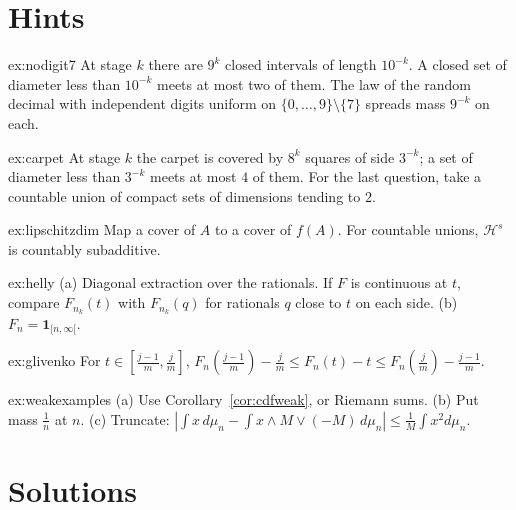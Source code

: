 \section{Hints}

\begin{hint}{ex:nodigit7}
At stage $k$ there are $9^k$ closed intervals of length $10^{-k}$. A closed set of diameter less than $10^{-k}$ meets at most two of them. The law of the random decimal with independent digits uniform on
$\{0,\ldots,9\}\setminus\{7\}$ spreads mass $9^{-k}$ on each.
\end{hint}
\begin{hint}{ex:carpet}
At stage $k$ the carpet is covered by $8^k$ squares of side $3^{-k}$; a set of diameter less than $3^{-k}$ meets at most $4$ of them. For the last question, take a countable union of compact sets of dimensions
tending to $2$.
\end{hint}
\begin{hint}{ex:lipschitzdim}
Map a cover of $A$ to a cover of $f(A)$. For countable unions, $\mathcal H^s$ is countably subadditive.
\end{hint}
\begin{hint}{ex:helly}
(a) Diagonal extraction over the rationals. If $F$ is continuous at $t$, compare $F_{n_k}(t)$ with $F_{n_k}(q)$ for rationals $q$ close to $t$ on each side. (b) $F_n=\mathbf 1_{[n,\infty[}$.
\end{hint}
\begin{hint}{ex:glivenko}
For $t\in[\frac{j-1}m,\frac jm]$, $F_n(\frac{j-1}m)-\frac jm\le F_n(t)-t\le F_n(\frac jm)-\frac{j-1}m$.
\end{hint}
\begin{hint}{ex:weakexamples}
(a) Use Corollary~\ref{cor:cdfweak}, or Riemann sums. (b) Put mass $\frac1n$ at $n$. (c) Truncate: $|\int x\,d\mu_n-\int x\wedge M\vee(-M)\,d\mu_n|\le\frac1M\int x^2d\mu_n$.
\end{hint}

\section{Solutions}

